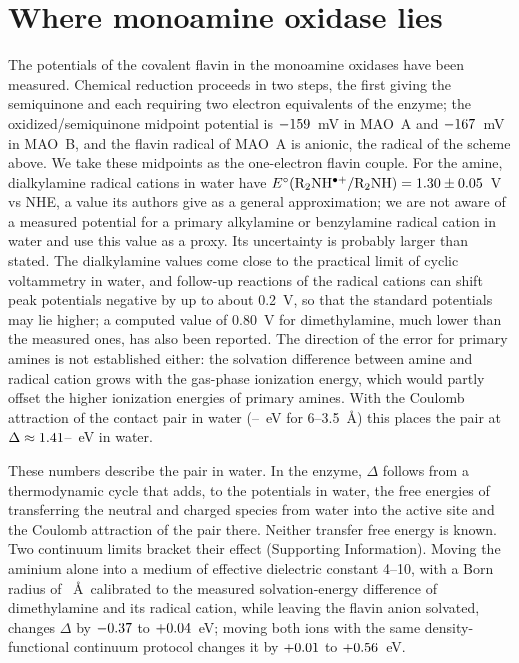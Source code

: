 \documentclass[aip,jcp,amsmath,amssymb,reprint]{revtex4-1}
\begin{document}
\section{Where monoamine oxidase lies}
\label{sec:mao}

The potentials of the covalent flavin in the monoamine oxidases have been
measured. Chemical reduction proceeds in two steps, the first giving the
semiquinone and each requiring two electron equivalents of the enzyme; the
oxidized/semiquinone midpoint potential is $-159$~mV in MAO~A and
$-167$~mV in MAO~B,\cite{Sablin2001} and the flavin radical of MAO~A is
anionic,\cite{Kay2007} the radical of the scheme above. We take these midpoints
as the one-electron flavin couple. For the amine, dialkylamine radical cations
in water have $E^\circ({\rm R_2NH^{\bullet+}/R_2NH}) = 1.30\pm0.05$~V vs
NHE, a value its authors give as a general approximation;\cite{Jonsson1996} we
are not aware of a measured potential for a primary alkylamine or benzylamine
radical cation in water and use this value as a proxy. Its uncertainty is
probably larger than stated. The dialkylamine values come close to the practical
limit of cyclic voltammetry in water, and follow-up reactions of the radical
cations can shift peak potentials negative by up to about 0.2~V, so that the
standard potentials may lie higher; a computed value of 0.80~V for
dimethylamine, much lower than the measured ones, has also been
reported.\cite{Jonsson1996} The direction
of the error for primary amines is not established either: the solvation
difference between amine and radical cation grows with the gas-phase ionization
energy,\cite{Jonsson1996} which would partly offset the higher ionization
energies of primary amines. With the Coulomb
attraction of the contact pair in water (\CoulLo--\CoulHi~eV for 6--3.5~\AA)
this places the pair at $\Delta\approx1.41$--\DeltaMAOhi~eV in water.

These numbers describe the pair in water. In the enzyme, $\Delta$ follows from a
thermodynamic cycle that adds, to the potentials in water, the free energies of
transferring the neutral and charged species from water into the active site and
the Coulomb attraction of the pair there. Neither transfer free energy is known.
Two continuum limits bracket their effect (Supporting Information). Moving the
aminium alone into a medium of effective dielectric constant 4--10, with a Born
radius of \BornRadius~\AA\ calibrated to the measured solvation-energy difference
of dimethylamine and its radical cation,\cite{Jonsson1996} while leaving the
flavin anion solvated, changes $\Delta$ by $-0.37$ to $+0.04$~eV; moving
both ions with the same density-functional continuum protocol changes it by
$+0.01$ to $+0.56$~eV.
\end{document}
